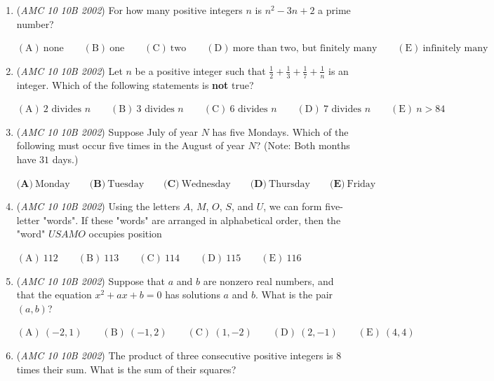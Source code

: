 \begin{enumerate}
$\mathrm{(A) \ } 3\pi\qquad \mathrm{(B) \ } 4\pi\qquad \mathrm{(C) \ } 6\pi\qquad \mathrm{(D) \ } 9\pi\qquad \mathrm{(E) \ } 12\pi$


	\item (\textit{AMC 10 10B 2002}) For how many positive integers $n$ is $n^2-3n+2$ a prime number?


 $\mathrm{(A) \ } \text{none}\qquad \mathrm{(B) \ } \text{one}\qquad \mathrm{(C) \ } \text{two}\qquad \mathrm{(D) \ } \text{more than two, but finitely many}\qquad \mathrm{(E) \ } \text{infinitely many}$


	\item (\textit{AMC 10 10B 2002}) Let $n$ be a positive integer such that $\frac{1}{2}+\frac{1}{3}+\frac{1}{7}+\frac{1}{n}$ is an integer. Which of the following statements is \textbf{not} true?


 $\mathrm{(A) \ } 2\text{ divides }n\qquad \mathrm{(B) \ } 3\text{ divides }n\qquad \mathrm{(C) \ } 6\text{ divides }n\qquad \mathrm{(D) \ } 7\text{ divides }n\qquad \mathrm{(E) \ } n>84$


	\item (\textit{AMC 10 10B 2002}) Suppose July of year $N$ has five Mondays. Which of the following must occur five times in the August of year $N$? (Note: Both months have $31$ days.)


 $\textbf{(A)}\ \text{Monday} \qquad \textbf{(B)}\ \text{Tuesday} \qquad \textbf{(C)}\ \text{Wednesday} \qquad \textbf{(D)}\ \text{Thursday} \qquad \textbf{(E)}\ \text{Friday}$


	\item (\textit{AMC 10 10B 2002}) Using the letters $A$, $M$, $O$, $S$, and $U$, we can form five-letter "words". If these "words" are arranged in alphabetical order, then the "word" $USAMO$ occupies position


 $\mathrm{(A) \ } 112\qquad \mathrm{(B) \ } 113\qquad \mathrm{(C) \ } 114\qquad \mathrm{(D) \ } 115\qquad \mathrm{(E) \ } 116$


	\item (\textit{AMC 10 10B 2002}) Suppose that $a$ and $b$ are nonzero real numbers, and that the equation $x^2+ax+b=0$ has solutions $a$ and $b$. What is the pair $(a,b)$?


 $\mathrm{(A) \ } (-2,1)\qquad \mathrm{(B) \ } (-1,2)\qquad \mathrm{(C) \ } (1,-2)\qquad \mathrm{(D) \ } (2,-1)\qquad \mathrm{(E) \ } (4,4)$


	\item (\textit{AMC 10 10B 2002}) The product of three consecutive positive integers is $8$ times their sum. What is the sum of their squares?



\end{enumerate}
